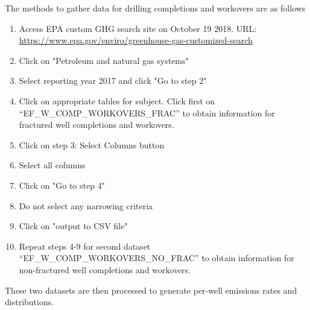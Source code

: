 \documentclass[11pt]{report}
\begin{document}
{{{{The methods to gather data for drilling completions and workovers are as follows

\begin{enumerate}
\item Access EPA custom GHG search site on October 19 2018. URL: \url{https://www.epa.gov/enviro/greenhouse-gas-customized-search}
\item Click on "Petroleum and natural gas systems"
\item Select reporting year 2017 and click "Go to step 2"
\item Click on appropriate tables for subject. Click first on \\ ``EF\_W\_COMP\_WORKOVERS\_FRAC'' to obtain information for fractured well completions and workovers.
\item Click on step 3: Select Columns button
\item Select all columns
\item Click on "Go to step 4"
\item Do not select any narrowing criteria
\item Click on "output to CSV file"
\item Repeat steps 4-9 for second dataset ``EF\_W\_COMP\_WORKOVERS\_NO\_FRAC'' to obtain information for non-fractured well completions and workovers.
\end{enumerate}

These two datasets are then processed to generate per-well emissions rates and distributions.

}}}}
\end{document}
